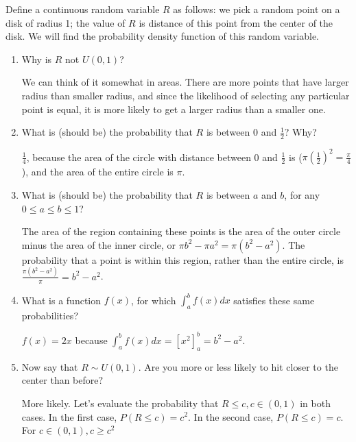 \question Define a continuous random variable $R$ as follows: we pick 
a random point on a disk of radius 1; the value of $R$ is distance of 
this point from the center of the disk. We will find the probability 
density function of this random variable.

\begin{enumerate}[label=(\alph*)]
\item Why is $R$ not $U(0,1)$?
\begin{solution}[0.5cm]
We can think of it somewhat in areas. There are more points that have larger radius than smaller radius, and since the likelihood of selecting any particular point is equal, it is more likely to get a larger radius than a smaller one.
\end{solution}
\item What is (should be) the probability that $R$ is between 0 and 
$\frac{1}{2}$? Why?
\begin{solution}[.5cm]
$\frac{1}{4}$, because the area of the circle with distance between 
0 and $\frac{1}{2}$ is ($\pi(\frac{1}{2})^2 = \frac{\pi}{4}$), and 
the area of the entire circle is $\pi$.
\end{solution}

\item What is (should be) the probability that $R$ is between $a$ 
and $b$, for any $0 \le a \le b \le 1$?
\begin{solution}[.5cm]
The area of the region containing these points is the area of the 
outer circle minus the area of the inner circle, or $\pi b^2 - \pi a^2 
= \pi(b^2 - a^2)$. The probability that a point is within this region, 
rather than the entire circle, is $\frac{\pi(b^2 - a^2)}{\pi} = b^2 - a^2$.
\end{solution}

\item What is a function $f(x)$, for which $\int_{a}^{b} f(x)dx$ 
satisfies these same probabilities?
\begin{solution}[.5cm] $f(x) = 2x$ because $\int_{a}^{b} f(x)dx = 
[x^2]_{a}^{b} = b^2 - a^2$. \end{solution}
\item Now say that $R \sim U(0,1)$. Are you more or less likely to hit closer to the center than before?
\begin{solution}
More likely. Let's evaluate the probability that $R\le c, c \in (0,1)$ in both cases. In the first case, $P(R\le c) = c^2$. In the second case, $P(R\le c) = c$. For $c \in (0,1), c \ge c^2$
\end{solution}

\end{enumerate}